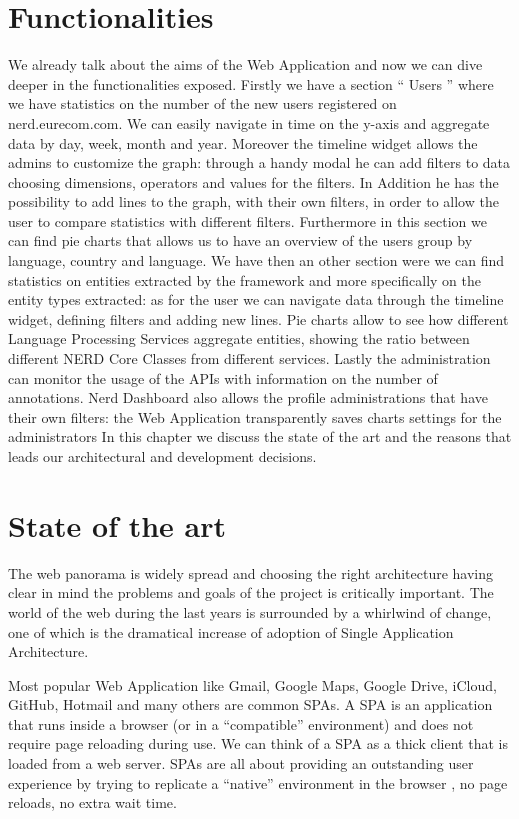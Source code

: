 \documentclass[a4paper,13pt]{report}
\begin{document}
\section{Functionalities}
    We already talk about the aims of the Web Application and now we can dive deeper in the functionalities exposed.
    Firstly we have a section `` Users '' where we have statistics on the number of the new users registered on nerd.eurecom.com. We can easily navigate in time on the y-axis and aggregate data by day, week, month and year. Moreover the timeline widget allows the admins to customize the graph: through a handy modal he can add filters to data choosing dimensions, operators and values for the filters. In Addition he has the possibility to add lines to the graph, with their own filters, in order to allow the user to compare statistics with different filters.
    Furthermore in this section we can find pie charts that allows us to have an overview of the users group by language, country and language.
    We have then an other section were we can find statistics on entities extracted by the framework and more specifically on the entity types extracted: as for the user we can navigate data through the timeline widget, defining filters and adding new lines. Pie charts allow to see how different Language Processing Services aggregate entities, showing the ratio between different NERD Core Classes from different services.
    Lastly the administration can monitor the usage of the APIs with information on the number of annotations.
    Nerd Dashboard also allows the profile administrations that have their own filters: the Web Application transparently saves charts settings for the administrators
   In this chapter we discuss the state of the art and the reasons that leads our architectural and development decisions.

\section{State of the art}
The web panorama is widely spread and choosing the right architecture having clear in mind the problems and goals of the project is critically important. 
The world of the web during the last years is surrounded by a whirlwind of change, one of which is the dramatical increase of adoption of Single Application Architecture.\newline

Most popular Web Application like Gmail, Google Maps, Google Drive, iCloud, GitHub, Hotmail and many others are common SPAs.
A SPA is an application that runs inside a browser (or in a ``compatible'' environment) and does not require page reloading during use. We can think of a SPA as a thick client that is loaded from a web server. 
SPAs are all about providing an outstanding user experience by trying to replicate a ``native'' environment in the browser , no page reloads, no extra wait time.
\end{document}

